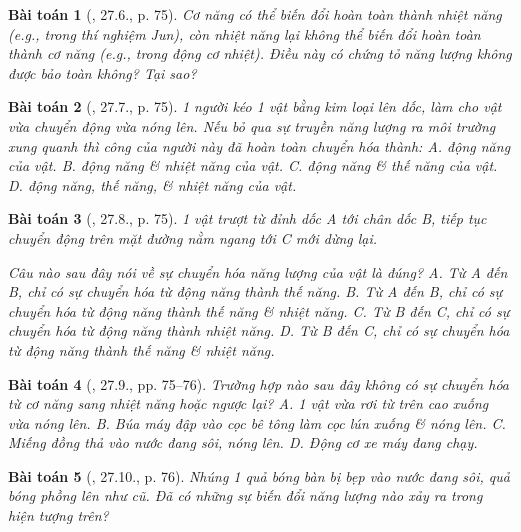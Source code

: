 \documentclass{article}
\newtheorem{baitoan}{Bài toán}
\begin{document}
\begin{baitoan}[\cite{SBT_Vat_Ly_8}, 27.6., p. 75]
	Cơ năng có thể biến đổi hoàn toàn thành nhiệt năng (e.g., trong thí nghiệm Jun), còn nhiệt năng lại không thể biến đổi hoàn toàn thành cơ năng (e.g., trong động cơ nhiệt). Điều này có chứng tỏ năng lượng không được bảo toàn không? Tại sao?
\end{baitoan}

\begin{baitoan}[\cite{SBT_Vat_Ly_8}, 27.7., p. 75]
	1 người kéo 1 vật bằng kim loại lên dốc, làm cho vật vừa chuyển động vừa nóng lên. Nếu bỏ qua sự truyền năng lượng ra môi trường xung quanh thì công của người này đã hoàn toàn chuyển hóa thành: {\sf A.} động năng của vật. {\sf B.} động năng \& nhiệt năng của vật. {\sf C.} động năng \& thế năng của vật. {\sf D.} động năng, thế năng, \& nhiệt năng của vật.
\end{baitoan}

\begin{baitoan}[\cite{SBT_Vat_Ly_8}, 27.8., p. 75]
	1 vật trượt từ đỉnh dốc A tới chân dốc B, tiếp tục chuyển động trên mặt đường nằm ngang tới C mới dừng lại. 
	\begin{center}
	\end{center}
	Câu nào sau đây nói về sự chuyển hóa năng lượng của vật là đúng? {\sf A.} Từ A đến B, chỉ có sự chuyển hóa từ động năng thành thế năng. {\sf B.} Từ A đến B, chỉ có sự chuyển hóa từ động năng thành thế năng \& nhiệt năng. {\sf C.} Từ B đến C, chỉ có sự chuyển hóa từ động năng thành nhiệt năng. {\sf D.} Từ B đến C, chỉ có sự chuyển hóa từ động năng thành thế năng \& nhiệt năng.
\end{baitoan}

\begin{baitoan}[\cite{SBT_Vat_Ly_8}, 27.9., pp. 75--76]
	Trường hợp nào sau đây không có sự chuyển hóa từ cơ năng sang nhiệt năng hoặc ngược lại? {\sf A.} 1 vật vừa rơi từ trên cao xuống vừa nóng lên. {\sf B.} Búa máy đập vào cọc bê tông làm cọc lún xuống \& nóng lên. {\sf C.} Miếng đồng thả vào nước đang sôi, nóng lên. {\sf D.} Động cơ xe máy đang chạy.
\end{baitoan}

\begin{baitoan}[\cite{SBT_Vat_Ly_8}, 27.10., p. 76]
	Nhúng 1 quả bóng bàn bị bẹp vào nước đang sôi, quả bóng phồng lên như cũ. Đã có những sự biến đổi năng lượng nào xảy ra trong hiện tượng trên?
\end{baitoan}
\end{document}
